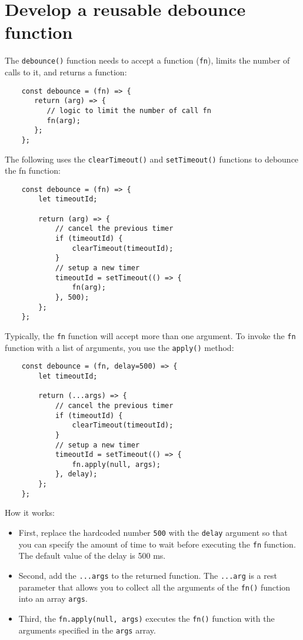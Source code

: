\documentclass[11pt]{article}
\begin{document}
\section*{Develop a reusable debounce function}

The \verb|debounce()| function needs to accept a function (\verb|fn|), limits the
number of calls to it, and returns a function:

\begin{lstlisting}
    const debounce = (fn) => {
       return (arg) => {
          // logic to limit the number of call fn
          fn(arg);
       };
    };
\end{lstlisting}

\noindent
The following uses the \verb|clearTimeout()| and \verb|setTimeout()| functions
to debounce the fn function:

\begin{lstlisting}
    const debounce = (fn) => {
        let timeoutId;

        return (arg) => {
            // cancel the previous timer
            if (timeoutId) {
                clearTimeout(timeoutId);
            }
            // setup a new timer
            timeoutId = setTimeout(() => {
                fn(arg);
            }, 500);
        };
    };
\end{lstlisting}

\noindent
Typically, the \verb|fn| function will accept more than one argument.
To invoke the \verb|fn| function with a list of arguments,
you use the \verb|apply()| method:

\begin{lstlisting}
    const debounce = (fn, delay=500) => {
        let timeoutId;

        return (...args) => {
            // cancel the previous timer
            if (timeoutId) {
                clearTimeout(timeoutId);
            }
            // setup a new timer
            timeoutId = setTimeout(() => {
                fn.apply(null, args);
            }, delay);
        };
    };
\end{lstlisting}

\noindent
How it works:

\begin{itemize}
\item First, replace the hardcoded number \verb|500| with the \verb|delay| argument so
that you can specify the amount of time to wait before executing the \verb|fn|
function. The default value of the delay is 500 ms.
\item Second, add the \verb|...args| to the returned function. The \verb|...arg|
is a rest parameter that allows you to collect all the arguments
of the \verb|fn()| function into an array \verb|args|.
\item Third, the \verb|fn.apply(null, args)| executes the \verb|fn()| function with
the arguments specified in the \verb|args| array.
\end{itemize}
\end{document}

